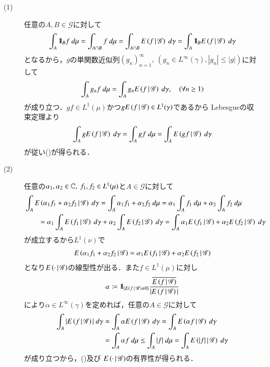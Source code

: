 	\begin{prf}\mbox{}
		\begin{description}
			\item[(1)]
				任意の$A,B \in \mathscr{G}$に対して
				\begin{align}
					\int_A \mbox{1}\hspace{-0.25em}\mbox{l}_B f\ d\mu
					= \int_{A \cap B} f\ d\mu
					= \int_{A \cap B} E\left( f \, \middle|\, \mathscr{G} \right)\ d\gamma
					= \int_A \mbox{1}\hspace{-0.25em}\mbox{l}_B E\left( f \, \middle|\, \mathscr{G} \right)\ d\gamma
				\end{align}
				となるから，$g$の単関数近似列$(g_n)_{n=1}^\infty,\ \left(g_n \in L^\infty(\gamma),|g_n| \leq |g|\right)$に対して
				\begin{align}
					\int_A g_n f\ d\mu = \int_A g_n E\left( f \, \middle|\, \mathscr{G} \right)\ d\gamma,
					\quad (\forall n \geq 1)
				\end{align}
				が成り立つ．$gf \in L^1(\mu)$かつ$gE\left( f \, \middle|\, \mathscr{G} \right) \in L^1(\gamma)$であるから
				Lebesgueの収束定理より
				\begin{align}
					\int_A g E\left( f \, \middle|\, \mathscr{G} \right)\ d\gamma
					= \int_A g f\ d\mu
					= \int_A E\left( g f \, \middle|\, \mathscr{G} \right)\ d\gamma
				\end{align}
				が従い()が得られる．
				
			\item[(2)]
				任意の$\alpha_1,\alpha_2 \in \mathbb{C},\ f_1,f_2 \in L^1(\mu)$と$A \in \mathscr{G}$に対して
				\begin{align}
					&\int_A \cexp{\alpha_1 f_1 + \alpha_2 f_2}{\mathscr{G}}\ d\gamma
					= \int_A \alpha_1 f_1 + \alpha_2 f_2\ d\mu
					= \alpha_1 \int_A f_1\ d\mu + \alpha_2 \int_A f_2\ d\mu \\
					&\qquad = \alpha_1 \int_A \cexp{f_1}{\mathscr{G}}\ d\gamma 
						+ \alpha_2 \int_A \cexp{f_2}{\mathscr{G}}\ d\gamma
					= \int_A \alpha_1 \cexp{f_1}{\mathscr{G}} + \alpha_2 \cexp{f_2}{\mathscr{G}}\ d\gamma
				\end{align}
				が成立するから$L^1(\nu)$で
				\begin{align}
					E\left( \alpha_1 f_1 + \alpha_2 f_2 \, \middle|\, \mathscr{G} \right)
					= \alpha_1 E\left( f_1 \, \middle|\, \mathscr{G} \right) + \alpha_2 E\left( f_2 \, \middle|\, \mathscr{G} \right)
				\end{align}
				となり$E\left( \cdot \, \middle|\, \mathscr{G} \right)$の線型性が出る．また$f \in L^1(\mu)$に対し
				\begin{align}
					\alpha \coloneqq \mbox{1}\hspace{-0.25em}\mbox{l}_{\left\{E\left( f \, \middle|\, \mathscr{G} \right) \neq 0\right\}} 
						\frac{\overline{E\left( f \, \middle|\, \mathscr{G} \right)}}{|E\left( f \, \middle|\, \mathscr{G} \right)|}
				\end{align}
				により$\alpha \in L^\infty(\gamma)$を定めれば，任意の$A \in \mathscr{G}$に対して
				\begin{align}
					\int_A |E\left( f \, \middle|\, \mathscr{G} \right)|\ d\gamma
					&= \int_A \alpha E\left( f \, \middle|\, \mathscr{G} \right)\ d\gamma
					= \int_A E\left( \alpha f \, \middle|\, \mathscr{G} \right)\ d\gamma \\
					&= \int_A \alpha f\ d\mu
					\leq \int_A |f|\ d\mu
					= \int_A E\left( |f| \, \middle|\, \mathscr{G} \right)\ d\gamma
				\end{align}
				が成り立つから，()及び
				$E\left( \cdot \, \middle|\, \mathscr{G} \right)$の有界性が得られる．
				

\end{description}
\end{prf}

